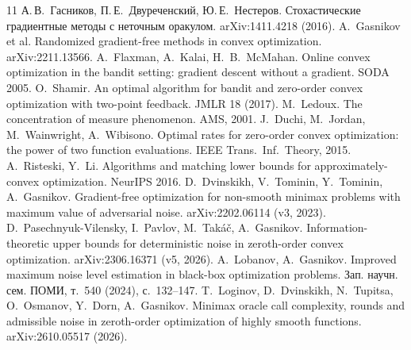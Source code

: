 \documentclass[12pt,a4paper]{article}
\theoremstyle{plain}
\theoremstyle{definition}
\theoremstyle{remark}
\begin{document}
\begin{thebibliography}{11}
 А.\,В.~Гасников, П.\,Е.~Двуреченский, Ю.\,Е.~Нестеров. Стохастические градиентные методы с неточным оракулом. arXiv:1411.4218 (2016).
 A.~Gasnikov et al. Randomized gradient-free methods in convex optimization. arXiv:2211.13566.
 A.~Flaxman, A.~Kalai, H.~B.~McMahan. Online convex optimization in the bandit setting: gradient descent without a gradient. SODA 2005.
 O.~Shamir. An optimal algorithm for bandit and zero-order convex optimization with two-point feedback. JMLR 18 (2017).
 M.~Ledoux. The concentration of measure phenomenon. AMS, 2001.
 J.~Duchi, M.~Jordan, M.~Wainwright, A.~Wibisono. Optimal rates for zero-order convex optimization: the power of two function evaluations. IEEE Trans.\ Inf.\ Theory, 2015.
 A.~Risteski, Y.~Li. Algorithms and matching lower bounds for approximately-convex optimization. NeurIPS 2016.
 D.~Dvinskikh, V.~Tominin, Y.~Tominin, A.~Gasnikov. Gradient-free optimization for non-smooth minimax problems with maximum value of adversarial noise. arXiv:2202.06114 (v3, 2023).
 D.~Pasechnyuk-Vilensky, I.~Pavlov, M.~Takáč, A.~Gasnikov. Information-theoretic upper bounds for deterministic noise in zeroth-order convex optimization. arXiv:2306.16371 (v5, 2026).
 A.~Lobanov, A.~Gasnikov. Improved maximum noise level estimation in black-box optimization problems. Зап. научн. сем. ПОМИ, т.~540 (2024), с.~132--147.
 T.~Loginov, D.~Dvinskikh, N.~Tupitsa, O.~Osmanov, Y.~Dorn, A.~Gasnikov. Minimax oracle call complexity, rounds and admissible noise in zeroth-order optimization of highly smooth functions. arXiv:2610.05517 (2026).
\end{thebibliography}
\end{document}
